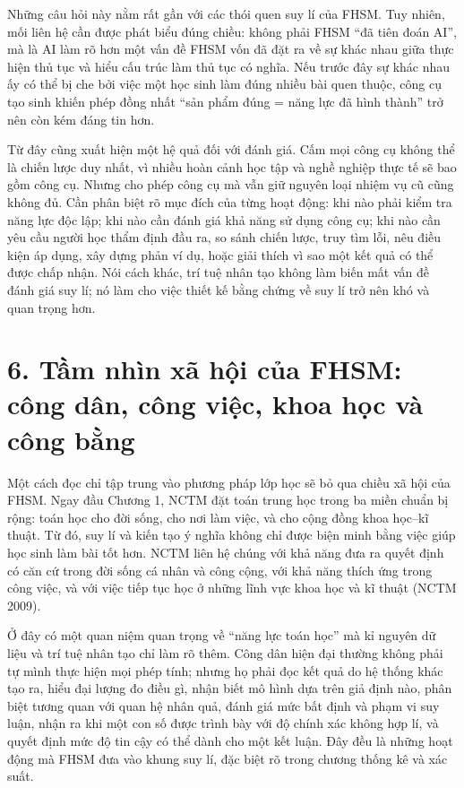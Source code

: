 Những câu hỏi này nằm rất gần với các thói quen suy lí của FHSM. Tuy nhiên,
mối liên hệ cần được phát biểu đúng chiều: không phải FHSM ``đã tiên đoán AI'',
mà là AI làm rõ hơn một vấn đề FHSM vốn đã đặt ra về sự khác nhau giữa thực
hiện thủ tục và hiểu cấu trúc làm thủ tục có nghĩa. Nếu trước đây sự khác nhau
ấy có thể bị che bởi việc một học sinh làm đúng nhiều bài quen thuộc, công cụ
tạo sinh khiến phép đồng nhất ``sản phẩm đúng = năng lực đã hình thành'' trở
nên còn kém đáng tin hơn.

Từ đây cũng xuất hiện một hệ quả đối với đánh giá. Cấm mọi công cụ không thể
là chiến lược duy nhất, vì nhiều hoàn cảnh học tập và nghề nghiệp thực tế sẽ
bao gồm công cụ. Nhưng cho phép công cụ mà vẫn giữ nguyên loại nhiệm vụ cũ
cũng không đủ. Cần phân biệt rõ mục đích của từng hoạt động: khi nào phải kiểm
tra năng lực độc lập; khi nào cần đánh giá khả năng sử dụng công cụ; khi nào
cần yêu cầu người học thẩm định đầu ra, so sánh chiến lược, truy tìm lỗi, nêu
điều kiện áp dụng, xây dựng phản ví dụ, hoặc giải thích vì sao một kết quả có
thể được chấp nhận. Nói cách khác, trí tuệ nhân tạo không làm biến mất vấn đề
đánh giá suy lí; nó làm cho việc thiết kế bằng chứng về suy lí trở nên khó và
quan trọng hơn.

\section*{6. Tầm nhìn xã hội của FHSM: công dân, công việc, khoa học và công bằng}

Một cách đọc chỉ tập trung vào phương pháp lớp học sẽ bỏ qua chiều xã hội của
FHSM. Ngay đầu Chương 1, NCTM đặt toán trung học trong ba miền chuẩn bị rộng:
toán học cho đời sống, cho nơi làm việc, và cho cộng đồng khoa học--kĩ thuật.
Từ đó, suy lí và kiến tạo ý nghĩa không chỉ được biện minh bằng việc giúp học
sinh làm bài tốt hơn. NCTM liên hệ chúng với khả năng đưa ra quyết định có căn
cứ trong đời sống cá nhân và công cộng, với khả năng thích ứng trong công việc,
và với việc tiếp tục học ở những lĩnh vực khoa học và kĩ thuật (NCTM 2009).

Ở đây có một quan niệm quan trọng về ``năng lực toán học'' mà kỉ nguyên dữ
liệu và trí tuệ nhân tạo chỉ làm rõ thêm. Công dân hiện đại thường không phải
tự mình thực hiện mọi phép tính; nhưng họ phải đọc kết quả do hệ thống khác
tạo ra, hiểu đại lượng đo điều gì, nhận biết mô hình dựa trên giả định nào,
phân biệt tương quan với quan hệ nhân quả, đánh giá mức bất định và phạm vi
suy luận, nhận ra khi một con số được trình bày với độ chính xác không hợp lí,
và quyết định mức độ tin cậy có thể dành cho một kết luận. Đây đều là những
hoạt động mà FHSM đưa vào khung suy lí, đặc biệt rõ trong chương thống kê và
xác suất.


